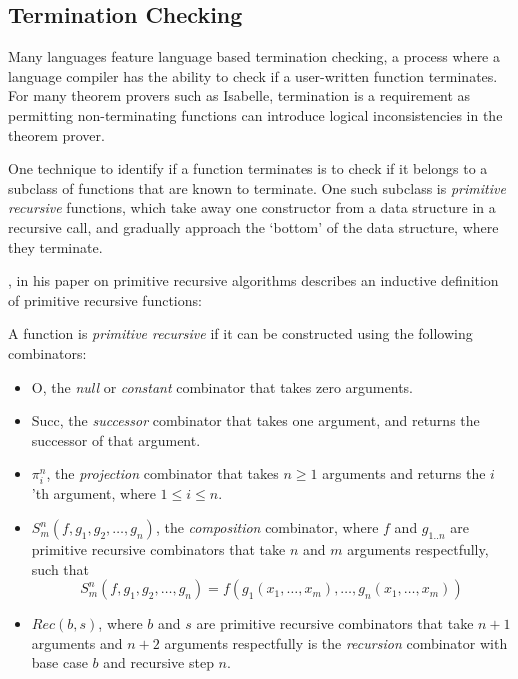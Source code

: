 \subsection{Termination Checking}

Many languages feature language based termination checking, a process
where a language compiler has the ability to check if a user-written function
terminates. For many theorem provers such as Isabelle, 
termination is a requirement as permitting non-terminating functions
can introduce logical inconsistencies in the theorem prover.

One technique to identify if a function terminates is to check if it belongs
to a subclass of functions that are known to terminate. One such subclass
is \textit{primitive recursive} functions, which take away one constructor
from a data structure in a recursive call, and gradually approach the
`bottom' of the data structure, where they terminate.

\citet{AboutPrimrecAlgorithms}, in his paper on primitive recursive algorithms 
describes an inductive definition of primitive recursive functions:

\theoremstyle{definition}
\begin{definition}
    \label{def:primrec}
    A function is \textit{primitive recursive} if it can be constructed using 
    the following combinators:

    \begin{itemize}
        \item 
            \textsf{O}, the \textit{null} or \textit{constant} combinator that takes zero arguments.
        \item 
            \textsf{Succ}, the \textit{successor} combinator that takes one argument, and returns the successor
            of that argument.
        \item 
            \textsf{$\pi^n_i$}, the \textit{projection} combinator that takes $n \geq 1$ arguments and returns
            the $i$'th argument, where $1 \leq i \leq n$.
        \item 
            \textsf{$S^n_m(f, g_1, g_2, \dots, g_n)$}, the \textit{composition} combinator, where $f$ and $g_{1..n}$ are 
            primitive recursive combinators that take $n$ and $m$ arguments respectfully, such that 
                $$S^n_m(f, g_1, g_2, \dots, g_n) = f(g_1(x_1, \dots, x_m), \dots, g_n(x_1, \dots, x_m))$$
        \item 
            \textsf{$Rec(b,s)$}, where $b$ and $s$ are primitive recursive combinators that take
            $n + 1$ arguments and $n + 2$ arguments respectfully is the \textit{recursion}
            combinator with base case $b$ and recursive step $n$.
    \end{itemize}
\end{definition}


